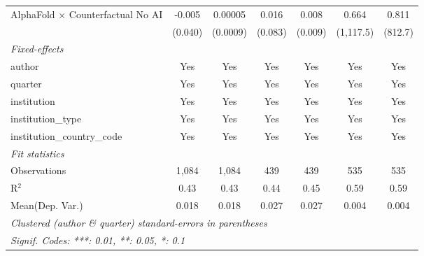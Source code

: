 \begin{tabular}{lcccccc}
   AlphaFold $\times$ Counterfactual No AI  & -0.005  & 0.00005  & 0.016   & 0.008   & 0.664     & 0.811\\   
                                            & (0.040) & (0.0009) & (0.083) & (0.009) & (1,117.5) & (812.7)\\   
   \midrule
   \emph{Fixed-effects}\\
   author                                   & Yes     & Yes      & Yes     & Yes     & Yes       & Yes\\  
   quarter                                  & Yes     & Yes      & Yes     & Yes     & Yes       & Yes\\  
   institution                              & Yes     & Yes      & Yes     & Yes     & Yes       & Yes\\  
   institution\_type                        & Yes     & Yes      & Yes     & Yes     & Yes       & Yes\\  
   institution\_country\_code               & Yes     & Yes      & Yes     & Yes     & Yes       & Yes\\  
   \midrule
   \emph{Fit statistics}\\
   Observations                             & 1,084   & 1,084    & 439     & 439     & 535       & 535\\  
   R$^2$                                    & 0.43    & 0.43     & 0.44    & 0.45    & 0.59      & 0.59\\  
Mean(Dep. Var.) & 0.018 & 0.018 & 0.027 & 0.027 & 0.004 & 0.004 \\
   \midrule \midrule
   \multicolumn{7}{l}{\emph{Clustered (author \& quarter) standard-errors in parentheses}}\\
   \multicolumn{7}{l}{\emph{Signif. Codes: ***: 0.01, **: 0.05, *: 0.1}}\\
\end{tabular}
\par\endgroup
